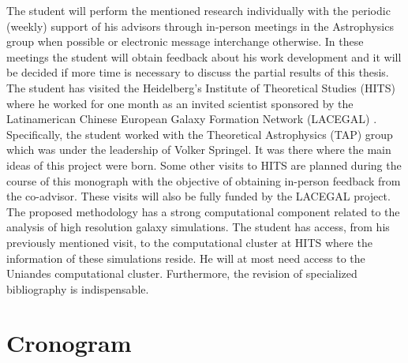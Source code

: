 \documentclass[12pt]{article}
\begin{document}



The student will perform the mentioned research individually with the periodic (weekly) support of his advisors through in-person meetings in the Astrophysics group when possible or electronic message interchange otherwise. In these meetings the student will obtain feedback about his work development and it will be decided if more time is necessary to discuss the partial results of this thesis. The student has visited  the Heidelberg's Institute of Theoretical Studies (HITS) where he worked for one month as an invited scientist sponsored by the Latinamerican Chinese European Galaxy Formation Network (LACEGAL) \cite{LACEGAL}. Specifically, the student worked with the Theoretical Astrophysics (TAP) group which was under the leadership of Volker Springel. It was there where the main ideas of this project were born. Some other visits to HITS are planned during the course of this monograph with the objective of obtaining in-person feedback from the co-advisor. These visits will also be fully funded by the LACEGAL project.\\

The proposed methodology has a strong computational component related to the analysis of high resolution galaxy simulations. The student has access, from his previously mentioned visit, to the computational cluster at HITS where the information of these simulations reside. He will at most need access to the Uniandes computational cluster. Furthermore, the revision of specialized bibliography is indispensable.\\


\section{Cronogram}
\end{document}

